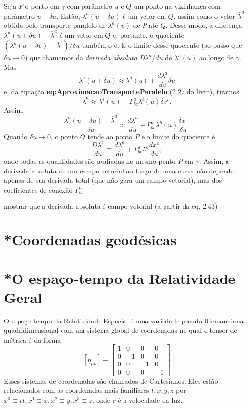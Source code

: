 Seja $ P $ o ponto em $ \gamma $ com parâmetro $ u $ e $ Q $ um ponto na vizinhança com parâmetro $ u+\delta u $. Então, $ \lambda^{a}(u+\delta u) $ é um vetor em $ Q $, assim como o vetor $ \bar{\lambda}^{a} $ obtido pelo transporte paralelo de $ \lambda^{a}(u) $ de $ P $ até $ Q$. Desse modo, a diferença $ \lambda^{a}(u+\delta u)-\bar{\lambda}^{a} $ é um vetor em $ Q $ e, portanto, o quociente $ \left(\lambda^{a}(u+\delta u)-\bar{\lambda}^{a}\right) / \delta u $ também o é. É o limite desse quociente (ao passo que $ \delta u \rightarrow 0 $) que chamamos da \textit{derivada absoluta} $ D \lambda^{a} / d u $ de $ \lambda^{a}(u) $ ao longo de $ \gamma $. Mas
\[
\lambda^{a}(u+\delta u) \approx \lambda^{a}(u)+\frac{d \lambda^{a}}{d u} \delta u
\]
e, da equação \textbf{eq:AproximacaoTransporteParalelo} {\color{red}(2.27 do livro)}, tiramos
\[
\bar{\lambda}^{a} \approx \lambda^{a}(u)-\Gamma_{b c}^{a} \lambda^{b}(u) \delta x^{c} .
\]
Assim,
\[
\frac{\lambda^{a}(u+\delta u)-\bar{\lambda}^{a}}{\delta u} \approx \frac{d \lambda^{a}}{d u}+\Gamma_{b c}^{a} \lambda^{b}(u) \frac{\delta x^{c}}{\delta u} .
\]
Quando $ \delta u \rightarrow 0 $, o ponto $ Q $ tende ao ponto $ P $ e o limite do quociente é 
\begin{equation}\label{eq:DerivadaAbsolutaDefinicao}
\boxed{
\frac{D \lambda^{a}}{d u} \equiv \frac{d \lambda^{a}}{d u}+\Gamma_{b c}^{a} \lambda^{b} \frac{d x^{c}}{d u} ,
}
\end{equation}
onde todas as quantidades são avaliadas no mesmo ponto $ P $ em $ \gamma $. Assim, a derivada absoluta de um campo vetorial ao longo de uma curva não depende apenas de sua derivada total (que não gera um campo vetorial), mas dos coeficientes de conexão $ \Gamma_{b c}^{a} $ 

{\color{red} mostrar que a derivada absoluta é campo vetorial (a partir da eq. 2.43)}

\section{*Coordenadas geodésicas}\label{sec:CoordenadasGeodesicas}


\section{*O espaço-tempo da Relatividade Geral}\label{sec:EspacotempoRelatividadeGeral}

O espaço-tempo da Relatividade Especial é uma variedade pseudo-Riemanniana quadridimensional com um sistema global de coordenadas no qual o tensor de métrica é da forma
\[
\left[\eta_{\mu \nu}\right] \equiv\left[\begin{array}{rrrr}{1} & {0} & {0} & {0} \\ {0} & {-1} & {0} & {0} \\ {0} & {0} & {-1} & {0} \\ {0} & {0} & {0} & {-1}\end{array}\right]
\]
Esses sistemas de coordenadas são chamados de Cartesianos. Eles estão relacionados com as coordenadas mais familiares $ t, x, y, z $ por $ x^0 \equiv ct, x^1\equiv x, x^2\equiv y, x^3 \equiv z $, onde $ c $ é a velocidade da luz.

